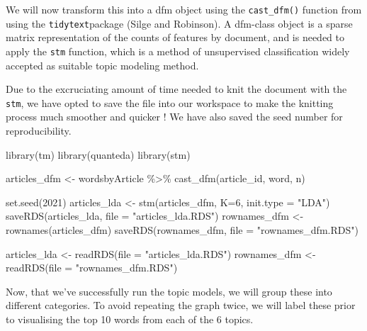 \documentclass[
]{article}
\newenvironment{Shaded}{\begin{snugshade}}{\end{snugshade}}
\newcommand{\AttributeTok}[1]{\textcolor[rgb]{0.77,0.63,0.00}{#1}}
\newcommand{\DecValTok}[1]{\textcolor[rgb]{0.00,0.00,0.81}{#1}}
\newcommand{\FunctionTok}[1]{\textcolor[rgb]{0.00,0.00,0.00}{#1}}
\newcommand{\NormalTok}[1]{#1}
\newcommand{\OtherTok}[1]{\textcolor[rgb]{0.56,0.35,0.01}{#1}}
\newcommand{\SpecialCharTok}[1]{\textcolor[rgb]{0.00,0.00,0.00}{#1}}
\newcommand{\StringTok}[1]{\textcolor[rgb]{0.31,0.60,0.02}{#1}}
\begin{document}
We will now transform this into a dfm object using the
\texttt{cast\_dfm()} function from using the \texttt{tidytext}package
(Silge and Robinson). A dfm-class object is a sparse matrix
representation of the counts of features by document, and is needed to
apply the \texttt{stm} function, which is a method of unsupervised
classification widely accepted as suitable topic modeling method.

Due to the excruciating amount of time needed to knit the document with
the \texttt{stm}, we have opted to save the file into our workspace to
make the knitting process much smoother and quicker ! We have also saved
the seed number for reproducibility.

\begin{Shaded}
\begin{Highlighting}[]
\FunctionTok{library}\NormalTok{(tm)}
\FunctionTok{library}\NormalTok{(quanteda)}
\FunctionTok{library}\NormalTok{(stm)}

\NormalTok{articles\_dfm }\OtherTok{\textless{}{-}}\NormalTok{ wordsbyArticle }\SpecialCharTok{\%\textgreater{}\%}
  \FunctionTok{cast\_dfm}\NormalTok{(article\_id, word, n)}

\FunctionTok{set.seed}\NormalTok{(}\DecValTok{2021}\NormalTok{)}
\NormalTok{articles\_lda }\OtherTok{\textless{}{-}} \FunctionTok{stm}\NormalTok{(articles\_dfm, }\AttributeTok{K=}\DecValTok{6}\NormalTok{, }\AttributeTok{init.type =} \StringTok{"LDA"}\NormalTok{)}
\FunctionTok{saveRDS}\NormalTok{(articles\_lda, }\AttributeTok{file =} \StringTok{"articles\_lda.RDS"}\NormalTok{)}
\NormalTok{rownames\_dfm }\OtherTok{\textless{}{-}} \FunctionTok{rownames}\NormalTok{(articles\_dfm)}
\FunctionTok{saveRDS}\NormalTok{(rownames\_dfm, }\AttributeTok{file =} \StringTok{"rownames\_dfm.RDS"}\NormalTok{)}
\end{Highlighting}
\end{Shaded}

\begin{Shaded}
\begin{Highlighting}[]
\NormalTok{articles\_lda }\OtherTok{\textless{}{-}} \FunctionTok{readRDS}\NormalTok{(}\AttributeTok{file =} \StringTok{"articles\_lda.RDS"}\NormalTok{)}
\NormalTok{rownames\_dfm  }\OtherTok{\textless{}{-}} \FunctionTok{readRDS}\NormalTok{(}\AttributeTok{file =} \StringTok{"rownames\_dfm.RDS"}\NormalTok{)}
\end{Highlighting}
\end{Shaded}

Now, that we've successfully run the topic models, we will group these
into different categories. To avoid repeating the graph twice, we will
label these prior to visualising the top 10 words from each of the 6
topics.
\end{document}

